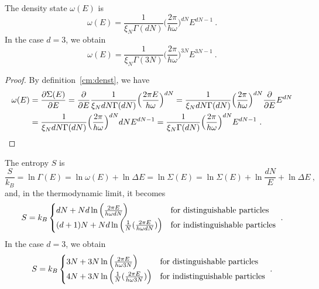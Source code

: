     The density state $\omega(E)$ is
    \begin{equation*}
        \omega (E) = \frac{1}{\xi_N \Gamma (dN)} \Big (\frac{2 \pi}{h \omega} \Big )^{dN} E^{dN-1} ~.
    \end{equation*}
    In the case $d = 3$, we obtain 
    \begin{equation*}
        \omega (E) = \frac{1}{\xi_N \Gamma (3N)} \Big (\frac{2 \pi}{h \omega} \Big )^{3N} E^{3N-1} ~.
    \end{equation*}
    \begin{proof}
        By definition~\eqref{cm:denst}, we have
        \begin{equation*}
        \begin{aligned}
            \omega (E) & = \frac{\partial\Sigma (E)}{\partial E} = \frac{\partial}{\partial E} \frac{1}{\xi_N dN \Gamma (dN)} \Big (\frac{2 \pi E}{h \omega} \Big )^{dN} = \frac{1}{\xi_N dN \Gamma (dN)} \Big (\frac{2 \pi}{h \omega} \Big )^{dN} \frac{\partial}{\partial E} E^{dN} \\ & = \frac{1}{\xi_N dN \Gamma (dN)} \Big (\frac{2 \pi}{h \omega} \Big )^{dN} dN E^{dN-1} = \frac{1}{\xi_N \Gamma (dN)} \Big (\frac{2 \pi}{h \omega} \Big )^{dN} E^{dN-1} ~.
        \end{aligned}
        \end{equation*}
    \end{proof}
    The entropy $S$ is
    \begin{equation*}
        \frac{S}{k_B} = \ln \Gamma(E) = \ln \omega(E) + \ln \Delta E = \ln \Sigma(E) = \ln \Sigma(E) + \ln \frac{dN}{E} + \ln \Delta E ~,
    \end{equation*}
    and, in the thermodynamic limit, it becomes
    \begin{equation*}
        S = k_B \begin{cases}
            d N + N d \ln \Big (\frac{2 \pi E }{h \omega d N} \Big) & \textnormal{for distinguishable particles} \\
            (d+1) N + N d \ln \Big ( \frac{1}{N} (\frac{2 \pi E }{h \omega d N} ) \Big ) & \textnormal{for indistinguishable particles} \\
        \end{cases} ~.
    \end{equation*}
    In the case $d = 3$, we obtain 
    \begin{equation*}
        S = k_B \begin{cases}
            3 N + 3 N \ln \Big (\frac{2 \pi E }{h \omega 3 N} \Big)  & \textnormal{for distinguishable particles} \\
            4 N + 3 N \ln \Big ( \frac{1}{N} (\frac{2 \pi E }{h \omega 3 N} ) \Big ) & \textnormal{for indistinguishable particles} \\
        \end{cases} ~.
    \end{equation*}
